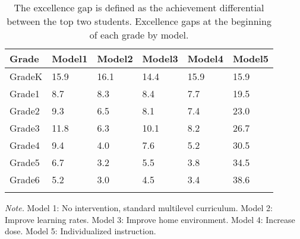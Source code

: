 \documentclass[english,floatsintext,jou]{apa6}
\theoremstyle{definition}
\theoremstyle{definition}
\theoremstyle{definition}
\theoremstyle{remark}
\begin{document}
\begin{table}[tbp]
\begin{center}
\begin{threeparttable}
\caption{\label{tab:exc-gaps}The excellence gap is defined as the achievement differential between the top two students. Excellence gaps at the beginning of each grade by model.}
\small{
\begin{tabular}{llllll}
\toprule
Grade & \multicolumn{1}{c}{Model1} & \multicolumn{1}{c}{Model2} & \multicolumn{1}{c}{Model3} & \multicolumn{1}{c}{Model4} & \multicolumn{1}{c}{Model5}\\
\midrule
GradeK & 15.9 & 16.1 & 14.4 & 15.9 & 15.9\\
Grade1 & 8.7 & 8.3 & 8.4 & 7.7 & 19.5\\
Grade2 & 9.3 & 6.5 & 8.1 & 7.4 & 23.0\\
Grade3 & 11.8 & 6.3 & 10.1 & 8.2 & 26.7\\
Grade4 & 9.4 & 4.0 & 7.6 & 5.2 & 30.5\\
Grade5 & 6.7 & 3.2 & 5.5 & 3.8 & 34.5\\
Grade6 & 5.2 & 3.0 & 4.5 & 3.4 & 38.6\\
\bottomrule
\addlinespace
\end{tabular}
}
\begin{tablenotes}[para]
\textit{Note.} Model 1: No intervention, standard multilevel curriculum. Model 2: Improve learning rates. Model 3: Improve home environment. Model 4: Increase dose. Model 5: Individualized instruction.
\end{tablenotes}
\end{threeparttable}
\end{center}
\end{table}
\end{document}
